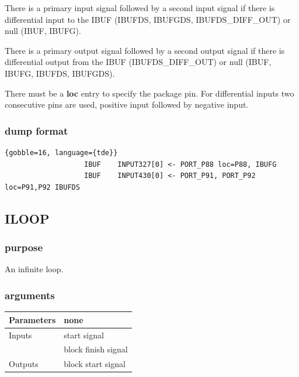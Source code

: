                 There is a primary input signal followed by a second input
                signal if there is differential input to the IBUF
                (IBUFDS, IBUFGDS, IBUFDS\_DIFF\_OUT) or null (IBUF, IBUFG).
                
                There is a primary output signal followed by a second output
                signal if there is differential output from the IBUF
                (IBUFDS\_DIFF\_OUT) or null (IBUF, IBUFG, IBUFDS, IBUFGDS).
                
                There must be a {\bf loc} entry to specify the package pin. For
                differential inputs two consecutive pins are used, positive input
                followed by negative input.

            
            \subsubsection{dump format}
            
                \begin{lstlisting}{gobble=16, language={tde}}
                   IBUF    INPUT327[0] <- PORT_P88 loc=P88, IBUFG
                   IBUF    INPUT430[0] <- PORT_P91, PORT_P92 loc=P91,P92 IBUFDS
                \end{lstlisting}



        \subsection{ILOOP}

            \subsubsection{purpose}
            
                An infinite loop.

            \subsubsection{arguments}
            
                \begin{tabular}{| l | l |}
                \hline
                Parameters  & none \\
                \hline
                Inputs      & start signal \\
                            & block finish signal \\
                \hline
                Outputs     & block start signal \\
                \hline
                \end{tabular}

